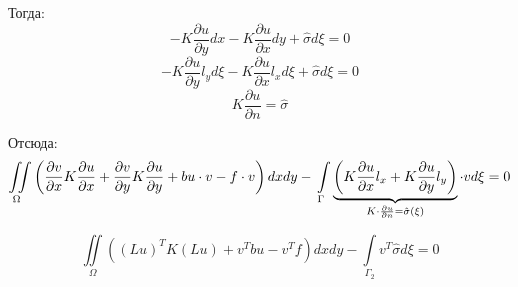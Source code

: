 \documentclass{bmstu}
\begin{document}
	Тогда:
	\[-K \frac{\partial u}{\partial y} dx -K \frac{\partial u}{\partial x} dy + \hat \sigma d\xi = 0\]
	\[-K \frac{\partial u}{\partial y} l_y d\xi -K \frac{\partial u}{\partial x} l_x d\xi + \hat \sigma d\xi = 0\]
	\[K \frac{\partial u}{\partial n} = \hat \sigma\]
	
	Отсюда:
	\begin{equation}\label{2d_eq_2}
	\iint \limits_{\Omega} \left(\frac{\partial v}{\partial x} K \frac{\partial u}{\partial x} + \frac{\partial v}{\partial y} K \frac{\partial u}{\partial y} + bu \cdot v - f \cdot v\right) dx dy - \\
	\int \limits_{\Gamma} \underbrace{ \left(K \frac{\partial u}{\partial x} l_x + K \frac{\partial u}{\partial y} l_y\right)}_{K \cdot \frac{\partial u}{\partial n} = \hat \sigma(\xi)}  \cdot v d\xi = 0 
	\end{equation}
	
	\[\iint \limits_{\Omega} ((Lu)^T K (Lu) + v^T bu - v^T f) dxdy - \int \limits_{\Gamma_2} v^T \hat \sigma d\xi = 0\]
	
	   
\end{document}
